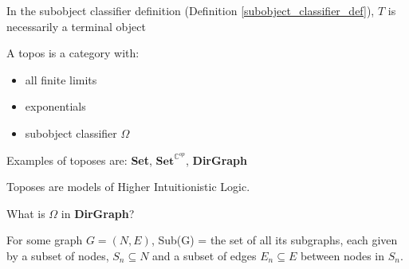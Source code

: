 \begin{exercise}
  In the subobject classifier definition 
  (Definition \ref{subobject_classifier_def}), $T$ is necessarily a
terminal object
\end{exercise}

\begin{definition}[Toposes]
  A topos is a category with: 
  \begin{itemize}
    \item all finite limits 
    \item exponentials
    \item subobject classifier $\Omega$
  \end{itemize}

Examples of toposes are: 
  \textbf{Set}, 
  $\textbf{Set}^{\mathbb{C}^{op}}$, 
  \textbf{DirGraph}

\end{definition}

\begin{remark}
  Toposes are models of Higher Intuitionistic Logic.
\end{remark}

\begin{exercise}
  What is $\Omega$ in \textbf{DirGraph}?

  For some graph 
  $G = (N, E)$, 
  Sub(G) = the set of all its subgraphs, each given by a subset of nodes,
  $S_n \subseteq N$
  and a subset of edges 
  $E_n \subseteq E$ 
  between nodes in $S_n$.

  \begin{center}
  \end{center}
\end{exercise}

